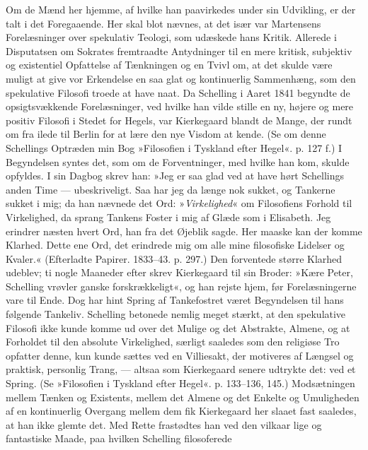 \documentclass[12pt,a4paper,openany]{book}
\newcommand{\opage}[1]{\marginnote{\footnotesize\textit{[#1]}}}
\begin{document}
Om de Mænd her hjemme, af hvilke han paavirkedes
under sin Udvikling, er der talt i det Foregaaende. Her
skal blot nævnes, at det især var Martensens Forelæsninger
over spekulativ Teologi, som udæskede hans
Kritik. Allerede i Disputatsen om Sokrates fremtraadte
Antydninger til en mere kritisk, subjektiv og existentiel
Opfattelse af Tænkningen og en Tvivl om, at det skulde
være muligt at give vor Erkendelse en saa glat og kontinuerlig
Sammenhæng, som den spekulative Filosofi
troede at have naat. Da Schelling i Aaret 1841 begyndte
de opsigtsvækkende Forelæsninger, ved hvilke han vilde
\opage{55}stille en ny, højere og mere positiv Filosofi i Stedet for
Hegels, var Kierkegaard blandt de Mange, der rundt om
fra ilede til Berlin for at lære den nye Visdom at kende.
(Se om denne Schellings Optræden min Bog »Filosofien
i Tyskland efter Hegel«. p. 127 f.) I Begyndelsen
syntes det, som om de Forventninger, med hvilke han
kom, skulde opfyldes. I sin Dagbog skrev han: »Jeg er
saa glad ved at have hørt Schellings anden Time --- ubeskriveligt.
Saa har jeg da længe nok sukket, og Tankerne
sukket i mig; da han nævnede det Ord: »\textit{Virkelighed}«
om Filosofiens Forhold til Virkelighed, da sprang
Tankens Foster i mig af Glæde som i Elisabeth. Jeg
erindrer næsten hvert Ord, han fra det Øjeblik sagde.
Her maaske kan der komme Klarhed. Dette ene Ord,
det erindrede mig om alle mine filosofiske Lidelser og
Kvaler.« (Efterladte Papirer. 1833--43. p. 297.) Den
forventede større Klarhed udeblev; ti nogle Maaneder
efter skrev Kierkegaard til sin Broder: »Kære Peter,
Schelling vrøvler ganske forskrækkeligt«, og han rejste
hjem, før Forelæsningerne vare til Ende. Dog har hint
Spring af Tankefostret været Begyndelsen til hans følgende
Tankeliv. Schelling betonede nemlig meget stærkt,
at den spekulative Filosofi ikke kunde komme ud over
det Mulige og det Abstrakte, Almene, og at Forholdet
til den absolute Virkelighed, særligt saaledes som den
religiøse Tro opfatter denne, kun kunde sættes ved en
Villiesakt, der motiveres af Længsel og praktisk, personlig
Trang, --- altsaa som Kierkegaard senere udtrykte
det: ved et Spring. (Se »Filosofien i Tyskland efter
Hegel«. p. 133--136, 145.) Modsætningen mellem Tænken
og Existents, mellem det Almene og det Enkelte og
Umuligheden af en kontinuerlig Overgang mellem dem
fik Kierkegaard her slaaet fast saaledes, at han ikke
glemte det. Med Rette frastødtes han ved den vilkaar%
\opage{56}lige og fantastiske Maade, paa hvilken Schelling filosoferede
\end{document}
